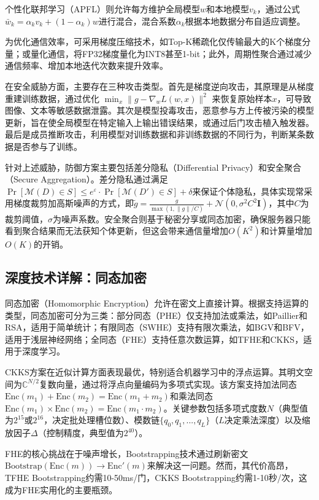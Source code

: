个性化联邦学习（APFL）则允许每方维护全局模型$w$和本地模型$v_k$，通过公式$\bar{w}_k = \alpha_k v_k + (1-\alpha_k) w$进行混合，混合系数$\alpha_k$根据本地数据分布自适应调整。

为优化通信效率，可采用梯度压缩技术，如Top-K稀疏化仅传输最大的K个梯度分量；或量化通信，将FP32梯度量化为INT8甚至1-bit；此外，周期性聚合通过减少通信频率、增加本地迭代次数来提升效率。

在安全威胁方面，主要存在三种攻击类型。首先是梯度逆向攻击，其原理是从梯度重建训练数据，通过优化 $\min_x \|g - \nabla_w L(w, x)\|^2$ 来恢复原始样本$x$，可导致图像、文本等敏感数据泄露。其次是模型投毒攻击，恶意参与方上传被污染的模型更新，旨在使全局模型在特定输入上输出错误结果，或通过后门攻击植入触发器。最后是成员推断攻击，利用模型对训练数据和非训练数据的不同行为，判断某条数据是否参与了训练。

针对上述威胁，防御方案主要包括差分隐私（Differential Privacy）和安全聚合（Secure Aggregation）。差分隐私通过满足$\Pr[\mathcal{M}(D) \in S] \leq e^\varepsilon \cdot \Pr[\mathcal{M}(D') \in S] + \delta$来保证个体隐私，具体实现常采用梯度裁剪加高斯噪声的方式，即$\tilde{g} = \frac{g}{\max(1, \|g\|/C)} + \mathcal{N}(0, \sigma^2 C^2 \mathbf{I})$，其中$C$为裁剪阈值，$\sigma$为噪声系数。安全聚合则基于秘密分享或同态加密，确保服务器只能看到聚合结果而无法获知个体更新，但这会带来通信量增加$O(K^2)$和计算量增加$O(K)$的开销。

\subsection{深度技术详解：同态加密}

同态加密（Homomorphic Encryption）允许在密文上直接计算\cite{HomomorphicEncryption2024, TFHE2024, CKKS2024}。根据支持运算的类型，同态加密可分为三类：部分同态（PHE）仅支持加法或乘法，如Paillier和RSA，适用于简单统计；有限同态（SWHE）支持有限次乘法，如BGV和BFV，适用于浅层神经网络；全同态（FHE）支持任意次数运算，如TFHE和CKKS，适用于深度学习。

CKKS方案在近似计算方面表现最优，特别适合机器学习中的浮点运算。其明文空间为$\mathbb{C}^{N/2}$复数向量，通过将浮点向量编码为多项式实现。该方案支持加法同态$\text{Enc}(m_1) + \text{Enc}(m_2) = \text{Enc}(m_1 + m_2)$和乘法同态$\text{Enc}(m_1) \times \text{Enc}(m_2) = \text{Enc}(m_1 \cdot m_2)$。关键参数包括多项式度数$N$（典型值为$2^{15}$或$2^{16}$，决定批处理槽位数）、模数链$\{q_0, q_1, ..., q_L\}$（$L$决定乘法深度）以及缩放因子$\Delta$（控制精度，典型值为$2^{40}$）。

FHE的核心挑战在于噪声增长，Bootstrapping技术通过刷新密文$\text{Bootstrap}(\text{Enc}(m)) \rightarrow \text{Enc}'(m)$来解决这一问题。然而，其代价高昂，TFHE Bootstrapping约需10-50ms/门，CKKS Bootstrapping约需1-10秒/次，这成为FHE实用化的主要瓶颈。

